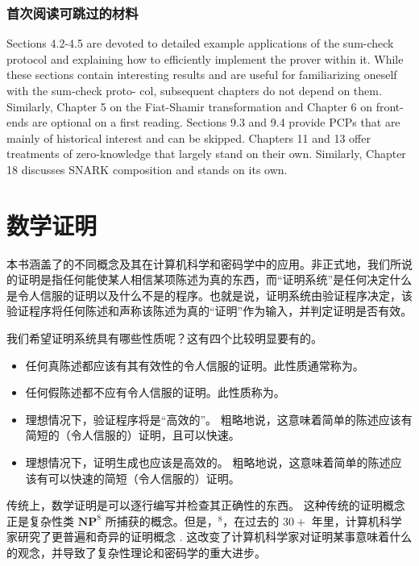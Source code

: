 \subsubsection{首次阅读可跳过的材料} Sections 4.2-4.5 are devoted to detailed example applications of the sum-check protocol and explaining how to efficiently implement the prover within it. While these sections contain interesting results and are useful for familiarizing oneself with the sum-check proto- col, subsequent chapters do not depend on them. Similarly, Chapter 5 on the Fiat-Shamir transformation and Chapter 6 on front-ends are optional on a first reading. Sections 9.3 and 9.4 provide PCPs that are mainly of historical interest and can be skipped.
Chapters 11 and 13 offer treatments of zero-knowledge that largely stand on their own. Similarly, Chapter 18 discusses SNARK composition and stands on its own.



\section{数学证明}
本书涵盖了的不同概念及其在计算机科学和密码学中的应用。非正式地，我们所说的证明是指任何能使某人相信某项陈述为真的东西，而“证明系统”是任何决定什么是令人信服的证明以及什么不是的程序。也就是说，证明系统由验证程序决定，该验证程序将任何陈述和声称该陈述为真的“证明”作为输入，并判定证明是否有效。

我们希望证明系统具有哪些性质呢？这有四个比较明显要有的。
\begin{itemize}
    \item 任何真陈述都应该有其有效性的令人信服的证明。此性质通常称为。
    \item 任何假陈述都不应有令人信服的证明。此性质称为。
    \item 理想情况下，验证程序将是“高效的”。 粗略地说，这意味着简单的陈述应该有简短的（令人信服的）证明，且可以快速。
    \item 理想情况下，证明生成也应该是高效的。 粗略地说，这意味着简单的陈述应该有可以快速的简短（令人信服的）证明。
\end{itemize}


传统上，数学证明是可以逐行编写并检查其正确性的东西。 这种传统的证明概念正是复杂性类 $\mathbf{N P}^8$ 所捕获的概念。但是，$^8$，在过去的 $30+$ 年里，计算机科学家研究了更普遍和奇异的证明概念 . 这改变了计算机科学家对证明某事意味着什么的观念，并导致了复杂性理论和密码学的重大进步。

